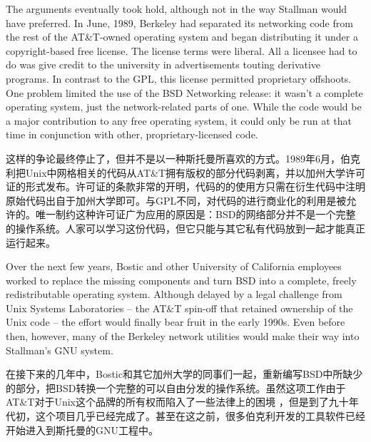 \ifdefined\eng
The arguments eventually took hold, although not in the way Stallman would have preferred. In June, 1989, Berkeley had separated its networking code from the rest of the AT\&T-owned operating system and began distributing it under a copyright-based free license. The license terms were liberal. All a licensee had to do was give credit to the university in advertisements touting derivative programs. In contrast to the GPL, this license permitted proprietary offshoots.  One problem limited the use of the BSD Networking release: it wasn't a complete operating system, just the network-related parts of one.  While the code would be a major contribution to any free operating system, it could only be run at that time in conjunction with other, proprietary-licensed code.
\fi

\ifdefined\chs
这样的争论最终停止了，但并不是以一种斯托曼所喜欢的方式。1989年6月，伯克利把Unix中网格相关的代码从AT\&T拥有版权的部分代码剥离，并以加州大学许可证的形式发布。许可证的条款非常的开明，代码的的使用方只需在衍生代码中注明原始代码出自于加州大学即可。与GPL不同，对代码的进行商业化的利用是被允许的。唯一制约这种许可证广为应用的原因是：BSD的网络部分并不是一个完整的操作系统。人家可以学习这份代码，但它只能与其它私有代码放到一起才能真正运行起来。
\fi

\ifdefined\eng
Over the next few years, Bostic and other University of California employees worked to replace the missing components and turn BSD into a complete, freely redistributable operating system. Although delayed by a legal challenge from Unix Systems Laboratories -- the AT\&T spin-off that retained ownership of the Unix code -- the effort would finally bear fruit in the early 1990s. Even before then, however, many of the Berkeley network utilities would make their way into Stallman's GNU system.
\fi

\ifdefined\chs
在接下来的几年中，Bostic和其它加州大学的同事们一起，重新编写BSD中所缺少的部分，把BSD转换一个完整的可以自由分发的操作系统。虽然这项工作由于AT\&T对于Unix这个品牌的所有权而陷入了一些法律上的困境 ，但是到了九十年代初，这个项目几乎已经完成了。甚至在这之前，很多伯克利开发的工具软件已经开始进入到斯托曼的GNU工程中。
\fi

